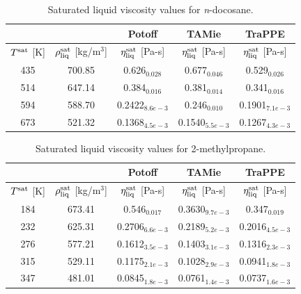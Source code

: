 \documentclass[preprint,review,12pt]{elsarticle}
\begin{document}
	\begin{table}[h!]
		\caption{Saturated liquid viscosity values for \textit{n}-docosane.}
		\begin{center}
			\begin{tabular}{|c|c|c|c|c|}
				\hline
				&                                       & Potoff            & TAMie             & TraPPE            \\ \hline
				$T^{\rm sat}$ {[}K{]} & $\rho^{\rm sat}_{\rm liq}$ [kg/m$^3$] & $\eta_{\rm liq}^{\rm sat}$ {[}Pa-s{]} & $\eta_{\rm liq}^{\rm sat}$ {[}Pa-s{]} & $\eta_{\rm liq}^{\rm sat}$ {[}Pa-s{]} \\ \hline
				435 & 700.85 & 0.626$_{0.028}$   & 0.677$_{0.046}$   & 0.529$_{0.026}$   \\ \hline
				514 & 647.14 & 0.384$_{0.016}$   & 0.381$_{0.014}$   & 0.341$_{0.016}$   \\ \hline
				594 & 588.70 & 0.2422$_{8.6e-3}$ & 0.246$_{0.010}$   & 0.1901$_{7.1e-3}$ \\ \hline
				673 & 521.32 & 0.1368$_{4.5e-3}$ & 0.1540$_{5.5e-3}$ & 0.1267$_{4.3e-3}$ \\ \hline
			\end{tabular}
		\end{center}
	\end{table}
	
	\begin{table}[h!]
		\caption{Saturated liquid viscosity values for 2-methylpropane.}
		\begin{center}
			\begin{tabular}{|c|c|c|c|c|}
				\hline
				&                                       & Potoff            & TAMie             & TraPPE            \\ \hline
				$T^{\rm sat}$ {[}K{]} & $\rho^{\rm sat}_{\rm liq}$ [kg/m$^3$] & $\eta_{\rm liq}^{\rm sat}$ {[}Pa-s{]} & $\eta_{\rm liq}^{\rm sat}$ {[}Pa-s{]} & $\eta_{\rm liq}^{\rm sat}$ {[}Pa-s{]} \\ \hline
				184 & 673.41 & 0.546$_{0.017}$   & 0.3630$_{9.7e-3}$ & 0.347$_{0.019}$   \\ \hline
				232 & 625.31 & 0.2706$_{6.6e-3}$ & 0.2189$_{5.2e-3}$ & 0.2016$_{4.5e-3}$ \\ \hline
				276 & 577.21 & 0.1612$_{3.5e-3}$ & 0.1403$_{3.1e-3}$ & 0.1316$_{2.3e-3}$ \\ \hline
				315 & 529.11 & 0.1175$_{2.1e-3}$ & 0.1028$_{2.9e-3}$ & 0.0941$_{1.8e-3}$ \\ \hline
				347 & 481.01 & 0.0845$_{1.8e-3}$ & 0.0761$_{1.4e-3}$ & 0.0737$_{1.6e-3}$ \\ \hline
			\end{tabular}
		\end{center}
	\end{table}
	
\end{document}
